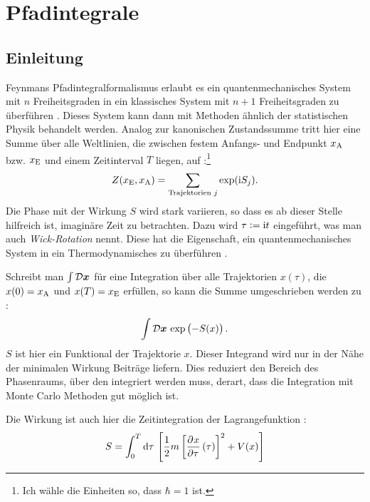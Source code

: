 
\chapter{Pfadintegrale}

\section{Einleitung}

Feynmans Pfadintegralformalismus erlaubt es ein quantenmechanisches System mit
$n$ Freiheitsgraden in ein klassisches System mit $n+1$ Freiheitsgraden zu
überführen \parencite[§12.4]{Thijssen/Computational_Physics}. Dieses System
kann dann mit Methoden ähnlich der statistischen Physik behandelt werden.
Analog zur kanonischen Zustandssumme tritt hier eine Summe über alle
Weltlinien, die zwischen festem Anfangs- und Endpunkt $x_\text A$ bzw. $x_\text
E$ und einem Zeitinterval $T$ liegen, auf
\parencite[(2.7)]{Creutz/Statistical_Approach_QM}:\footnote {Ich wähle die
Einheiten so, dass $\hbar = 1$ ist.}
\[
    Z(x_\text E, x_\text A) = \sum_{\text{Trajektorien $j$}} \exp(\mathrm i S_j).
\]
Die Phase mit der Wirkung $S$ wird stark variieren, so dass es ab dieser Stelle
hilfreich ist, imaginäre Zeit zu betrachten. Dazu wird $\tau := \mathrm i t$
eingeführt, was man auch \emph{Wick-Rotation} nennt. Diese hat die Eigenschaft,
ein quantenmechanisches System in ein Thermodynamisches zu überführen
\parencite[24]{Stetz/AQT}.

Schreibt man $\int \mathcal D \boldsymbol{x}$ für eine Integration über alle
Trajektorien $x(\tau)$, die $x(0) = x_\text A$ und $x(T) = x_\text E$ erfüllen,
so kann die Summe umgeschrieben werden zu
\parencite[(2.1)]{Creutz/Statistical_Approach_QM}:
\[
    \int \funcmeasure \, \exp\del{-S(x)}.
\]
$S$ ist hier ein Funktional der Trajektorie $x$. Dieser Integrand wird nur in
der Nähe der minimalen Wirkung Beiträge liefern. Dies reduziert den Bereich des
Phasenraums, über den integriert werden muss, derart, dass die Integration mit
Monte Carlo Methoden gut möglich ist.

Die Wirkung ist auch hier die Zeitintegration der Lagrangefunktion
\parencite[(2.5)]{Creutz/Statistical_Approach_QM}:
\[
    S = \int_0^T \dif \tau \, \sbr{\frac 12 m \sbr{\dpd x\tau(\tau)}^2 + V(x)}
\]

